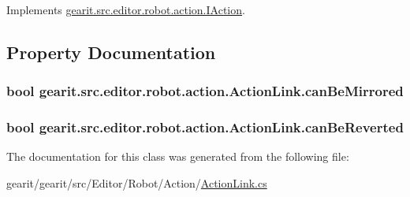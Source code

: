 Implements \hyperlink{interfacegearit_1_1src_1_1editor_1_1robot_1_1action_1_1_i_action_a8a84360c15fcd7d0f60ff7aef2dca980}{gearit.\+src.\+editor.\+robot.\+action.\+I\+Action}.



\subsection{Property Documentation}
\hypertarget{classgearit_1_1src_1_1editor_1_1robot_1_1action_1_1_action_link_a5d41488298b03db3ac4c5345e0ae0cdb}{
\subsubsection[{can\+Be\+Mirrored}]{\setlength{\rightskip}{0pt plus 5cm}bool gearit.\+src.\+editor.\+robot.\+action.\+Action\+Link.\+can\+Be\+Mirrored\hspace{0.3cm}{\ttfamily [get]}}}\label{classgearit_1_1src_1_1editor_1_1robot_1_1action_1_1_action_link_a5d41488298b03db3ac4c5345e0ae0cdb}
\hypertarget{classgearit_1_1src_1_1editor_1_1robot_1_1action_1_1_action_link_a5e9723b2669a907ff2d732adbcf7d2c8}{
\subsubsection[{can\+Be\+Reverted}]{\setlength{\rightskip}{0pt plus 5cm}bool gearit.\+src.\+editor.\+robot.\+action.\+Action\+Link.\+can\+Be\+Reverted\hspace{0.3cm}{\ttfamily [get]}}}\label{classgearit_1_1src_1_1editor_1_1robot_1_1action_1_1_action_link_a5e9723b2669a907ff2d732adbcf7d2c8}


The documentation for this class was generated from the following file\+:\begin{DoxyCompactItemize}
\item 
gearit/gearit/src/\+Editor/\+Robot/\+Action/\hyperlink{_action_link_8cs}{Action\+Link.\+cs}\end{DoxyCompactItemize}
